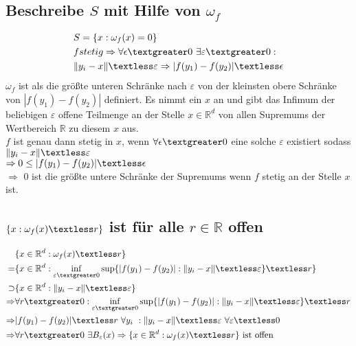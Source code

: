 \documentclass[12pt,a4paper]{article}
\begin{document}
\subsection{Beschreibe $S$ mit Hilfe von $\omega_f$}
\begin{align*}
	&S = \{x: \omega_f(x) = 0 \} \\
	&f stetig \Rightarrow \forall \epsilon \textgreater 0  \ \exists \varepsilon \textgreater 0:\\
	 &\lVert y_i -x \lVert \textless \varepsilon \Rightarrow  |f(y_1) - f(y_2) | \textless \epsilon 
\end{align*}
$\omega_f$ ist als die größte unteren Schränke nach $\varepsilon$ von der kleinsten obere Schränke von $|f(y_1) - f(y_2)|$ definiert. Es nimmt ein $x$ an und gibt das Infimum der beliebigen $\varepsilon $ offene Teilmenge an der Stelle $x \in \mathbb{R}^d$ von allen Supremums der Wertbereich $\mathbb{R}$ zu diesem $x$ aus. \\
$f$ ist genau dann stetig in $x$, wenn $\forall \epsilon \textgreater 0$ eine solche $\varepsilon$ existiert sodass$ \lVert y_i -x \lVert\textless \varepsilon$  \\$\Rightarrow0 \leq |f(y_1) - f(y_2) | \textless \epsilon$\\
$\Rightarrow$ 0 ist die größte untere Schränke der Supremums wenn $f$ stetig an der Stelle $x$ ist.

\subsection{$\{x: \omega_f(x) \textless r\}$ ist für alle $r \in \mathbb{R}$ offen}
\begin{align*}
	&\{x \in \mathbb{R}^d: \omega_f(x) \textless r\} \\
	= &\{x \in \mathbb{R}^d: \inf_{\varepsilon \textgreater 0}\sup\{|f(y_1) - f(y_2)|: \lVert y_i -x \lVert\textless \varepsilon\} \textless r\}\\
	\supset &\{x \in \mathbb{R}^d: \lVert y_i -x \lVert \textless \varepsilon \}\\
	\Rightarrow & \forall r \textgreater 0: \inf_{\varepsilon \textgreater 0}\sup\{|f(y_1) - f(y_2)|: \lVert y_i -x \lVert\textless \varepsilon\} \textless r \\
	\Rightarrow &|f(y_1) - f(y_2)| \textless r \ \forall y_i \ : \lVert y_i -x \lVert \textless \varepsilon   \ \forall \varepsilon \textless 0\\
	\Rightarrow & \forall r \textgreater 0 \ \exists B_{\varepsilon}(x) \Rightarrow \{x \in \mathbb{R}^d: \omega_f(x) \textless r\} \text{ ist offen}
\end{align*}
\end{document}
